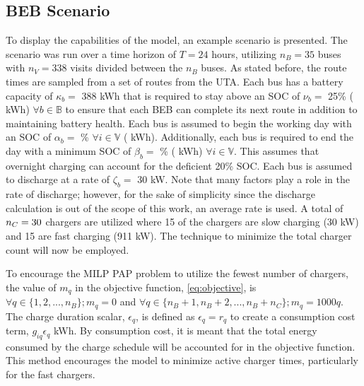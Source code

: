 \documentclass[ee,thesis]{usuthesis}
\newcommand{\A}{35 }                                                            %
\newcommand{\N}{338 }                                                           %
\newcommand{\acharge}{0.9 }                                                     %
\newcommand{\bcharge}{0.7 }                                                     %
\newcommand{\mincharge}{25\% }                                                  %
\newcommand{\minchargeD}{0.25 }                                                 %
\newcommand{\batsize}{388 }                                                     %
\newcommand{\fast}{15 }                                                         %
\newcommand{\slow}{15 }                                                         %
\newcommand{\fasts}{911 }                                                       %
\newcommand{\slows}{30 }                                                        %
\begin{document}
\subsection{BEB Scenario}
\label{beb-scenario}
To display the capabilities of the model, an example scenario is presented. The scenario was run over a time horizon of
\(T=24\) hours, utilizing \(n_B = \A\) buses with \(n_V = \N\) visits divided between the \(n_B\) buses. As stated before, the
route times are sampled from a set of routes from the UTA. Each bus has a battery capacity of \(\kappa_b =\) \batsize kWh that
is required to stay above an SOC of \(\nu_b =\) \mincharge (\fpeval{\batsize * \minchargeD} kWh) \(\forall b \in
\mathbb{B}\) to ensure that each BEB can complete its next route in addition to maintaining battery health. Each bus is
assumed to begin the working day with an SOC of \(\alpha_b =\) \fpeval{\acharge*100}\% \(\forall i \in \mathbb{V}\)
(\fpeval{\acharge * \batsize} kWh). Additionally, each bus is required to end the day with a minimum SOC of \(\beta_b =\)
\fpeval{\bcharge * 100}\% (\fpeval{\bcharge * \batsize} kWh) \(\forall i \in \mathbb{V}\). This assumes that overnight
charging can account for the deficient 20\% SOC. Each bus is assumed to discharge at a rate of \(\zeta_b =\) 30 kW. Note that
many factors play a role in the rate of discharge; however, for the sake of simplicity since the discharge calculation
is out of the scope of this work, an average rate is used. A total of \(n_C = \fpeval{\fast + \slow}\) chargers are
utilized where \slow of the chargers are slow charging (\slows kW) and \fast are fast charging (\fasts kW). The
technique to minimize the total charger count will now be employed.

To encourage the MILP PAP problem to utilize the fewest number of chargers, the value of \(m_q\) in the objective
function, \autoref{eq:objective}, is \(\forall q \in \{1,2,..., n_B \}; m_q = 0\) and \(\forall q \in \{n_B + 1, n_B + 2,..., n_B + n_C \};
m_q = 1000q\). The charge duration scalar, \(\epsilon_q\), is defined as \(\epsilon_q = r_q\) to create a consumption cost term,
\(g_{iq}\epsilon_q\) kWh. By consumption cost, it is meant that the total energy consumed by the charge schedule will be
accounted for in the objective function. This method encourages the model to minimize active charger times, particularly
for the fast chargers.
\end{document}
